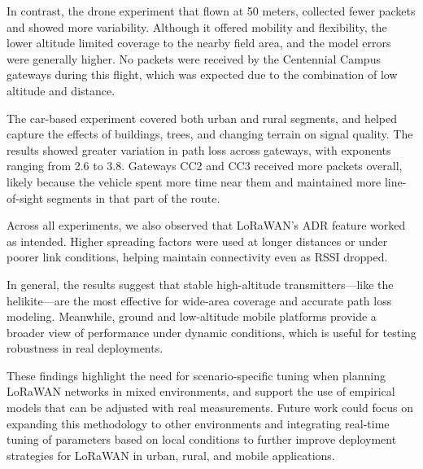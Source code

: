 \documentclass[journal]{IEEEtran}
\begin{document}
In contrast, the drone experiment that flown at 50 meters, collected fewer packets and showed more variability. Although it offered mobility and flexibility, the lower altitude limited coverage to the nearby field area, and the model errors were generally higher. No packets were received by the Centennial Campus gateways during this flight, which was expected due to the combination of low altitude and distance.

The car-based experiment covered both urban and rural segments, and helped capture the effects of buildings, trees, and changing terrain on signal quality. The results showed greater variation in path loss across gateways, with exponents ranging from 2.6 to 3.8. Gateways CC2 and CC3 received more packets overall, likely because the vehicle spent more time near them and maintained more line-of-sight segments in that part of the route.

Across all experiments, we also observed that LoRaWAN's ADR feature worked as intended. Higher spreading factors were used at longer distances or under poorer link conditions, helping maintain connectivity even as RSSI dropped.

In general, the results suggest that stable high-altitude transmitters—like the helikite—are the most effective for wide-area coverage and accurate path loss modeling. Meanwhile, ground and low-altitude mobile platforms provide a broader view of performance under dynamic conditions, which is useful for testing robustness in real deployments.

These findings highlight the need for scenario-specific tuning when planning LoRaWAN networks in mixed environments, and support the use of empirical models that can be adjusted with real measurements. Future work could focus on expanding this methodology to other environments and integrating real-time tuning of parameters based on local conditions to further improve deployment strategies for LoRaWAN in urban, rural, and mobile applications.


\end{document}
